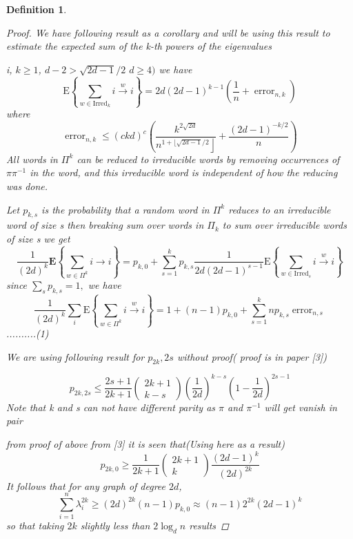\documentclass[oneside]{book}
\newtheorem{mydef}{Definition}
\begin{document}
\begin{mydef}
\begin{proof}
We have following result as a corollary and will be using this result to estimate the expected sum of the k-th powers of the eigenvalues \par
  i, $k \geq 1$,  $d-2>\sqrt{2 d-1} / 2$  $d \geq 4)$ we have
$$
\mathrm{E}\left\{\sum_{w \in \mathrm{Irred}_{k}} i \stackrel{w}{\rightarrow} i\right\}=2 d(2 d-1)^{k-1}\left(\frac{1}{n}+\operatorname{error}_{n, k}\right)
$$
where
$$
\operatorname{error}_{n, k} \leq(c k d)^{c}\left(\frac{k^{2 \sqrt{2 d}}}{\left.n^{1+\lfloor\sqrt{2 d-1} / 2}\right\rfloor}+\frac{(2 d-1)^{-k / 2}}{n}\right)
$$
All words in $\Pi^{k}$ can be reduced to irreducible words by removing occurrences of $\pi \pi^{-1}$ in the word, and this irreducible word is independent of how the reducing was done. \par 
Let  $p_{k,s}$ is the probability that a random word in  $\Pi^{k}$ reduces to an irreducible word of size s then breaking sum over words in  $\Pi_k$ to sum over irreducible words of size s  we get  
$$
\frac{1}{(2 d)^{k}} \mathbf{E}\left\{\sum_{w \in \Pi^{k}} i\rightarrow i\right\}=p_{k, 0}+\sum_{s=1}^{k} p_{k, s} \frac{1}{2 d(2 d-1)^{s-1}} \mathrm{E}\left\{\sum_{w \in \mathrm{Irred}_{s}} i \stackrel{w}{\rightarrow} i\right\}
$$
  since $\sum_{s} p_{k, s}=1,$ we have
$$ 
\frac{1}{(2 d)^{k}} \sum_{i} \mathrm{E}\left\{\sum_{w \in \Pi^{k}} i \stackrel{w}{\rightarrow} i\right\}=1+(n-1) p_{k, 0}+\sum_{s=1}^{k} n p_{k, s} \operatorname{error}_{n, s} 
$$    ..........(1)\par
We are using following result for $p_{2k},{2s}$ without proof( proof is in paper [3])  \par
$$
p_{2 k, 2 s} \leq \frac{2 s+1}{2 k+1}\left(\begin{array}{c}
2 k+1 \\
k-s
\end{array}\right)\left(\frac{1}{2 d}\right)^{k-s}\left(1-\frac{1}{2 d}\right)^{2 s-1}
$$
 Note that k and s can not have different parity as  $\pi$ and $\pi^{-1}$ will get vanish in pair\par
   from proof of above from [3] it is seen that(Using here as a result)  
$$ p_{2 k, 0} \geq \frac{1}{2 k+1}\left(\begin{array}{c}
2 k+1 \\
k
\end{array}\right) \frac{(2 d-1)^{k}}{(2 d)^{2 k}}$$
It follows that for any graph of degree $2 d$,
$$
\sum_{i=1}^{n} \lambda_{i}^{2 k} \geq(2 d)^{2 k}(n-1) p_{k, 0} \approx(n-1) 2^{2 k}(2 d-1)^{k}
$$
so that taking $2 k$ slightly less than $2 \log _{d} n$ results 

\end{proof}
\end{mydef}
\end{document}
